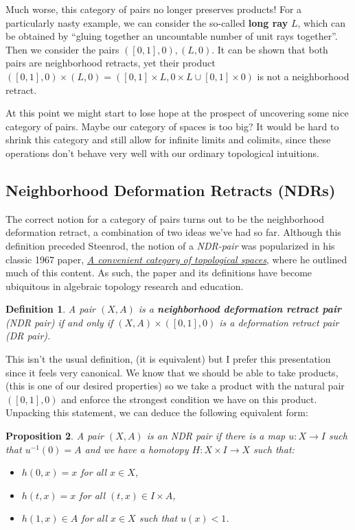 \documentclass{article}
\newtheorem{definition}{Definition}[subsection]
\newtheorem{proposition}[definition]{Proposition}
\begin{document}
Much worse, this category of pairs no longer preserves products! For a particularly nasty example, we can consider the so-called \textbf{long ray} $L$, which can be obtained by ``gluing together an uncountable number of unit rays together''. Then we consider the pairs $([0,1], 0), (L, 0)$. It can be shown that both pairs are neighborhood retracts, yet their product $([0,1], 0)\times (L, 0) = ([0,1]\times L, 0\times L\cup [0,1]\times 0)$ is not a neighborhood retract.

At this point we might start to lose hope at the prospect of uncovering some nice category of pairs. Maybe our category of spaces is too big? It would be hard to shrink this category and still allow for infinite limits and colimits, since these operations don't behave very well with our ordinary topological intuitions. 

\subsection{Neighborhood Deformation Retracts (NDRs)}

The correct notion for a category of pairs turns out to be the neighborhood deformation retract, a combination of two ideas we've had so far. Although this definition preceded Steenrod, the notion of a \emph{NDR-pair} was popularized in his classic 1967 paper, \underline{\emph{A convenient category of topological spaces}}, where he outlined much of this content. As such, the paper and its definitions have become ubiquitous in algebraic topology research and education. 

\begin{definition}
  A pair $(X,A)$ is a \textbf{neighborhood deformation retract pair} (NDR pair) if and only if $(X,A)\times ([0,1], 0)$ is a deformation retract pair (DR pair).
\end{definition}

This isn't the usual definition, (it is equivalent) but I prefer this presentation since it feels very canonical. We know that we should be able to take products, (this is one of our desired properties) so we take a product with the natural pair $([0,1],0)$ and enforce the strongest condition we have on this product. Unpacking this statement, we can deduce the following equivalent form: 

\begin{proposition}
  A pair $(X,A)$ is an NDR pair if there is a map $u : X \to I$ such that $u^{-1}(0)=A$ and we have a homotopy $H :X \times I \to X$ such that:
  \begin{itemize}
    \item $h(0,x)=x$ for all $x\in X$,
    \item $h(t,x)=x$ for all $(t,x)\in I\times A$,
    \item $h(1,x)\in A$ for all $x\in X$ such that $u(x)<1$.
  \end{itemize}
\end{proposition}
\end{document}
